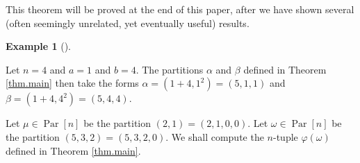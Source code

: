 \documentclass[numbers=enddot,12pt,final,onecolumn,notitlepage]{scrartcl}%
\theoremstyle{definition}
\newtheorem{exam}[theo]{Example}
\newenvironment{example}[1][]
{\begin{exam}[#1]\begin{leftbar}}
{\end{leftbar}\end{exam}}
\begin{document}
This theorem will be proved at the end of this paper, after we have shown
several (often seemingly unrelated, yet eventually useful) results.

\begin{example}
Let $n=4$ and $a=1$ and $b=4$. The partitions $\alpha$ and $\beta$ defined in
Theorem \ref{thm.main} then take the forms $\alpha=\left(  1+4,1^{2}\right)
=\left(  5,1,1\right)  $ and $\beta=\left(  1+4,4^{2}\right)  =\left(
5,4,4\right)  $.

Let $\mu\in\operatorname*{Par}\left[  n\right]  $ be the partition $\left(
2,1\right)  =\left(  2,1,0,0\right)  $. Let $\omega\in\operatorname*{Par}%
\left[  n\right]  $ be the partition $\left(  5,3,2\right)  =\left(
5,3,2,0\right)  $. We shall compute the $n$-tuple $\varphi\left(
\omega\right)  $ defined in Theorem \ref{thm.main}.


\end{example}
\end{document}
